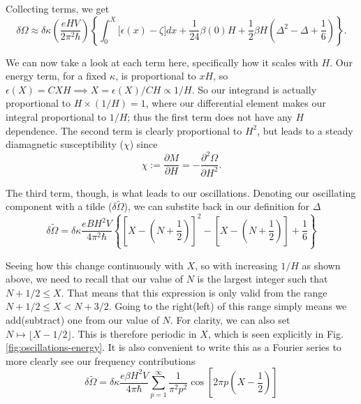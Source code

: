 \documentclass[12pt]{revtex4-2}
\begin{document}
Collecting terms, we get 
\begin{equation}
    \delta \Omega \approx \delta\kappa\left( \frac{eHV}{2\pi^2\hbar} \right)\left\{ \int_0^X \big[\epsilon(x)-\zeta\big]dx + \frac{1}{24}\beta(0)H + \frac{1}{2}\beta H\left( \Delta^2 - \Delta + \frac{1}{6} \right) \right\}.
\end{equation}

We can now take a look at each term here, specifically how it scales with $H$.  Our energy term, for a fixed $\kappa$, is proportional to $xH$, so $\epsilon(X) = CXH \implies X = \epsilon(X)/CH \propto 1/H$.  So our integrand is actually proportional to $H\times(1/H)=1$, where our differential element makes our integral proportional to $1/H$; thus the first term does not have any $H$ dependence.  The second term is clearly proportional to $H^2$, but leads to a steady diamagnetic susceptibility ($\chi$) since
\begin{equation}
    \chi := \frac{\partial M}{\partial H} = -\frac{\partial^2\Omega}{\partial H^2}.
\end{equation}

The third term, though, is what leads to our oscillations.  Denoting our oscillating component with a tilde ($\delta\tilde{\Omega}$), we can substite back in our definition for $\Delta$
\begin{equation}\label{eqn:potential-step}
    \boxed{\delta\tilde{\Omega} = \delta \kappa \frac{eBH^2V}{4\pi^2\hbar} \left\{ \left[ X - \left( N + \frac{1}{2} \right)\right]^2 - \left[ X - \left( N + \frac{1}{2} \right)\right] + \frac{1}{6} \right\}}
\end{equation}

Seeing how this change continuously with $X$, so with increasing $1/H$ as shown above, we need to recall that our value of $N$ is the largest integer such that $N + 1/2 \leq X$.  That means that this expression is only valid from the range $N + 1/2 \leq X < N + 3/2$.  Going to the right(left) of this range simply means we add(subtract) one from our value of $N$.  For clarity, we can also set $N \mapsto \lfloor X-1/2 \rfloor$.  This is therefore periodic in $X$, which is seen explicitly in Fig. \ref{fig:oscillations-energy}.  It is also convenient to write this as a Fourier series to more clearly see our frequency contributions
\begin{equation}
    \boxed{\delta\tilde{\Omega} = \delta \kappa \frac{e\beta H^2V}{4\pi\hbar} \sum_{p=1}^\infty \frac{1}{\pi^2 p^2}\cos\left[ 2\pi p\left( X - \frac{1}{2} \right) \right]}
\end{equation}
\end{document}
